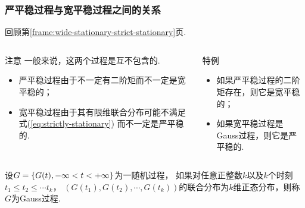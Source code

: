 \begin{frame}
    \frametitle{严平稳过程与宽平稳过程之间的关系}
    回顾第\ref{frame:wide-stationary-strict-stationary}页. 
    \begin{columns}
        \begin{column}{.6\columnwidth}
            \begin{alertblock}{注意}
                一般来说，这两个过程是互不包含的.
                \begin{itemize}
                    \item 严平稳过程由于不一定有二阶矩而不一定是宽平稳的；
                    \item 宽平稳过程由于其有限维联合分布可能不满足式(\ref{eq:strictly-stationary})
                            而不一定是严平稳的. 
                \end{itemize}
            \end{alertblock}    
        \end{column}
        \begin{column}{.3\columnwidth}
            \begin{exampleblock}{特例}
                \begin{itemize}
                    \item 如果严平稳过程的二阶矩存在，则它是宽平稳的；
                    \item 如果宽平稳过程是Gauss过程，则它是严平稳的. 
                \end{itemize}
            \end{exampleblock}  
        \end{column}        
    \end{columns}

    \begin{mydefinition}[Gauss过程]
        设$G=\left\{G(t),-\infty<t<+\infty\right\}$为一随机过程，
        如果对任意正整数$k$以及$k$个时刻$t_1\leqslant t_2\leqslant \cdots t_k$，
        $(G(t_1), G(t_2),\cdots, G(t_k))$的联合分布为$k$维正态分布，则称$G$为Gauss过程. 
    \end{mydefinition}

\end{frame}
